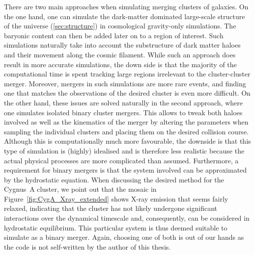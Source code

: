 \documentclass[MScProj_TLRH_ClusterEnergy.tex]{subfiles}
\begin{document}
There are two main approaches when simulating merging clusters of galaxies. On the
one hand, one can simulate the dark-matter dominated large-scale structure of 
the universe (\ref{sec:structure}) in cosmological gravity-only simulations.
The baryonic content can then be added later on to a region of interest. Such 
simulations naturally take into account the substructure of dark matter haloes 
and their movement along the cosmic filament. While such an approach does result in more 
accurate simulations, the down side is that the majority of the computational time
is spent tracking large regions irrelevant to the cluster-cluster merger. 
Moreover, mergers in such simulations are more rare events, and finding one that 
matches the observations of the desired cluster is even more difficult. On the 
other hand, these issues are solved naturally in the second approach, where one 
simulates isolated binary cluster mergers. This allows to tweak both haloes 
involved as well as the kinematics of the merger by altering the parameters when
sampling the individual clusters and placing them on the desired collision course.
Although this is computationally much more favourable, the downside is that this 
type of simulation is (highly) idealised and is therefore less realistic because
the actual physical processes are more complicated than assumed. Furthermore, a
requirement for binary mergers is that the system involved can be approximated
by the hydrostatic equation. When discussing the desired method for the Cygnus~A
cluster, we point out that the mosaic in Figure~\ref{fig:CygA_Xray_extended} 
shows X-ray emission that seems fairly relaxed, indicating that the cluster has 
not likely undergone significant interactions over the dynamical timescale and,
consequently, can be considered in hydrostatic equilibrium. This particular system
is thus deemed suitable to simulate as a binary merger. Again, choosing one of
both is out of our hands as the code is not self-written by the author of this
thesis.

% 
% 
% 
% 
% 
% 
% 
% 
% 
% 
\end{document}
